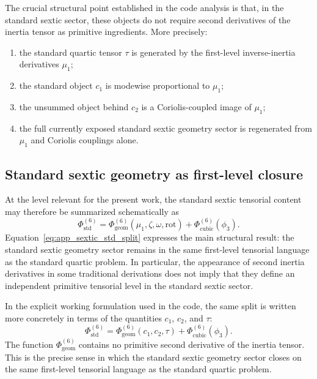 \documentclass[journal=jacsat,manuscript=article]{achemso}
\begin{document}
The crucial structural point established in the code analysis is that, in the
standard sextic sector, these objects do not require second derivatives of the
inertia tensor as primitive ingredients. More precisely:
\begin{enumerate}
\item the standard quartic tensor $\tau$ is generated by the first-level
inverse-inertia derivatives $\mu_1$;
\item the standard object $c_1$ is modewise proportional to $\mu_1$;
\item the unsummed object behind $c_2$ is a Coriolis-coupled image of $\mu_1$;
\item the full currently exposed standard sextic geometry sector is regenerated
from $\mu_1$ and Coriolis couplings alone.
\end{enumerate}

\subsection{Standard sextic geometry as first-level closure}

At the level relevant for the present work, the standard sextic tensorial
content may therefore be summarized schematically as
\begin{equation}
\Phi^{(6)}_{\mathrm{std}}
=
\Phi^{(6)}_{\mathrm{geom}}(\mu_1,\zeta,\omega,\mathrm{rot})
+
\Phi^{(6)}_{\mathrm{cubic}}(\phi_3).
\label{eq:app_sextic_std_split}
\end{equation}
Equation~\eqref{eq:app_sextic_std_split} expresses the main structural result:
the standard sextic geometry sector remains in the same first-level tensorial
language as the standard quartic problem. In particular, the appearance of
second inertia derivatives in some traditional derivations does not imply that
they define an independent primitive tensorial level in the standard sextic
sector.

In the explicit working formulation used in the code, the same split is
written more concretely in terms of the quantities $c_1$, $c_2$, and $\tau$:
\begin{equation}
\Phi^{(6)}_{\mathrm{std}}
=
\Phi^{(6)}_{\mathrm{geom}}(c_1,c_2,\tau)
+
\Phi^{(6)}_{\mathrm{cubic}}(\phi_3).
\label{eq:app_sextic_std_split_c1c2}
\end{equation}
The function $\Phi^{(6)}_{\mathrm{geom}}$ contains no primitive second
derivative of the inertia tensor. This is the precise sense in which the
standard sextic geometry sector closes on the same first-level tensorial
language as the standard quartic problem.
\end{document}
